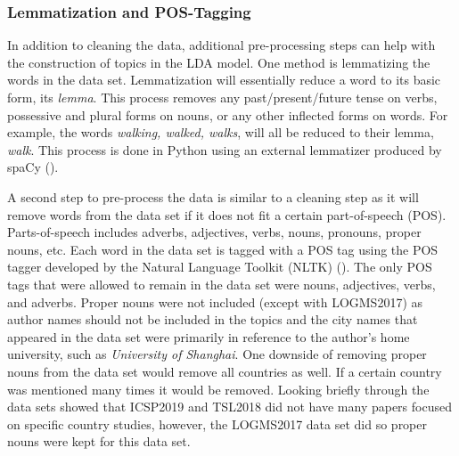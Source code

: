 \documentclass[a4paper, 12pt, twoside]{article}
\numberwithin{equation}{section} %
\begin{document}
\begin{table}[H]
\centering
{}
\caption[Cleaned data matrix example]{Subset of matrix showing cleaned textual data after removal of stop words. Note that words connected by underscores are formed bigrams.}
\label{tab:cleaned data}
\end{table}

\subsubsection{Lemmatization and POS-Tagging}

In addition to cleaning the data, additional pre-processing steps can help with the construction of topics in the LDA model. One method is lemmatizing the words in the data set. Lemmatization will essentially reduce a word to its basic form, its \textit{lemma}. This process removes any past/present/future tense on verbs, possessive and plural forms on nouns, or any other inflected forms on words. For example, the words \textit{walking, walked, walks}, will all be reduced to their lemma, \textit{walk}. This process is done in Python using an external lemmatizer produced by spaCy (\cite{spacy}). 

A second step to pre-process the data is similar to a cleaning step as it will remove words from the data set if it does not fit a certain part-of-speech (POS). Parts-of-speech includes adverbs, adjectives, verbs, nouns, pronouns, proper nouns, etc.  Each word in the data set is tagged with a POS tag using the POS tagger developed by the Natural Language Toolkit (NLTK) (\cite{nltk}). The only POS tags that were allowed to remain in the data set were nouns, adjectives, verbs, and adverbs. Proper nouns were not included (except with LOGMS2017) as author names should not be included in the topics and the city names that appeared in the data set were primarily in reference to the author's home university, such as \textit{University of Shanghai}. One downside of removing proper nouns from the data set would remove all countries as well. If a certain country was mentioned many times it would be removed. Looking briefly through the data sets showed that ICSP2019 and TSL2018 did not have many papers focused on specific country studies, however, the LOGMS2017 data set did so proper nouns were kept for this data set. 
\end{document}
